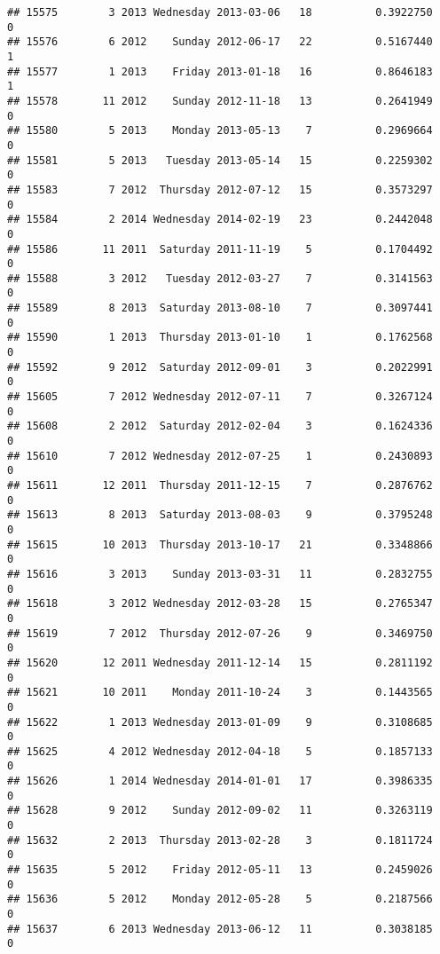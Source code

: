 \documentclass[
]{article}
\begin{document}
\begin{verbatim}
## 15575        3 2013 Wednesday 2013-03-06   18          0.3922750             0
## 15576        6 2012    Sunday 2012-06-17   22          0.5167440             1
## 15577        1 2013    Friday 2013-01-18   16          0.8646183             1
## 15578       11 2012    Sunday 2012-11-18   13          0.2641949             0
## 15580        5 2013    Monday 2013-05-13    7          0.2969664             0
## 15581        5 2013   Tuesday 2013-05-14   15          0.2259302             0
## 15583        7 2012  Thursday 2012-07-12   15          0.3573297             0
## 15584        2 2014 Wednesday 2014-02-19   23          0.2442048             0
## 15586       11 2011  Saturday 2011-11-19    5          0.1704492             0
## 15588        3 2012   Tuesday 2012-03-27    7          0.3141563             0
## 15589        8 2013  Saturday 2013-08-10    7          0.3097441             0
## 15590        1 2013  Thursday 2013-01-10    1          0.1762568             0
## 15592        9 2012  Saturday 2012-09-01    3          0.2022991             0
## 15605        7 2012 Wednesday 2012-07-11    7          0.3267124             0
## 15608        2 2012  Saturday 2012-02-04    3          0.1624336             0
## 15610        7 2012 Wednesday 2012-07-25    1          0.2430893             0
## 15611       12 2011  Thursday 2011-12-15    7          0.2876762             0
## 15613        8 2013  Saturday 2013-08-03    9          0.3795248             0
## 15615       10 2013  Thursday 2013-10-17   21          0.3348866             0
## 15616        3 2013    Sunday 2013-03-31   11          0.2832755             0
## 15618        3 2012 Wednesday 2012-03-28   15          0.2765347             0
## 15619        7 2012  Thursday 2012-07-26    9          0.3469750             0
## 15620       12 2011 Wednesday 2011-12-14   15          0.2811192             0
## 15621       10 2011    Monday 2011-10-24    3          0.1443565             0
## 15622        1 2013 Wednesday 2013-01-09    9          0.3108685             0
## 15625        4 2012 Wednesday 2012-04-18    5          0.1857133             0
## 15626        1 2014 Wednesday 2014-01-01   17          0.3986335             0
## 15628        9 2012    Sunday 2012-09-02   11          0.3263119             0
## 15632        2 2013  Thursday 2013-02-28    3          0.1811724             0
## 15635        5 2012    Friday 2012-05-11   13          0.2459026             0
## 15636        5 2012    Monday 2012-05-28    5          0.2187566             0
## 15637        6 2013 Wednesday 2013-06-12   11          0.3038185             0

\end{verbatim}
\end{document}
